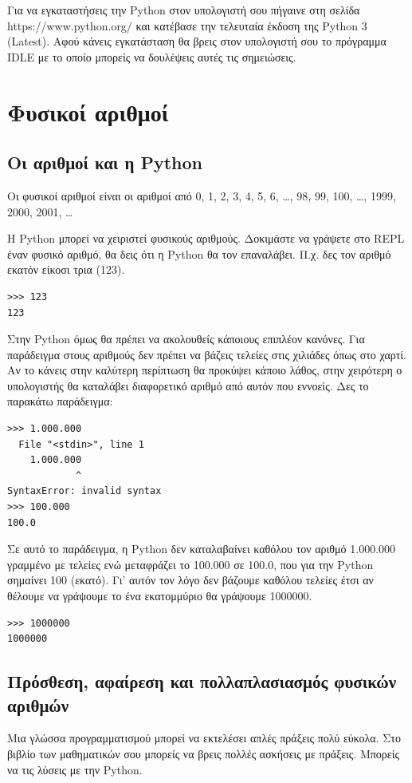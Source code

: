 \documentclass[b5paper,11pt,twoside,openleft]{memoir}
\begin{document}
Για να εγκαταστήσεις την Python στον υπολογιστή σου πήγαινε στη σελίδα https://www.python.org/ και κατέβασε την τελευταία έκδοση της Python 3 (Latest). Αφού κάνεις εγκατάσταση θα βρεις στον υπολογιστή σου το πρόγραμμα IDLE με το οποίο μπορείς να δουλέψεις αυτές τις σημειώσεις.

\chapter{Φυσικοί αριθμοί}

\section{Οι αριθμοί και η Python}

Οι φυσικοί αριθμοί είναι οι αριθμοί από 0, 1, 2, 3, 4, 5, 6, \ldots, 98, 99, 100, \ldots, 1999, 2000, 2001, \ldots

Η Python μπορεί να χειριστεί φυσικούς αριθμούς. Δοκιμάστε να γράψετε στο REPL έναν φυσικό αριθμό, θα δεις ότι η Python θα τον επαναλάβει. Π.χ. δες τον αριθμό εκατόν είκοσι τρια (123).
\begin{lstlisting}
>>> 123
123
\end{lstlisting}

Στην Python όμως θα πρέπει να ακολουθείς κάποιους επιπλέον κανόνες. Για παράδειγμα στους αριθμούς δεν πρέπει να βάζεις τελείες στις χιλιάδες όπως στο χαρτί. Αν το κάνεις στην καλύτερη περίπτωση θα προκύψει κάποιο λάθος, στην χειρότερη ο υπολογιστής θα καταλάβει διαφορετικό αριθμό από αυτόν που εννοείς.
Δες το παρακάτω παράδειγμα:
\begin{lstlisting}
>>> 1.000.000
  File "<stdin>", line 1
    1.000.000
            ^
SyntaxError: invalid syntax
>>> 100.000
100.0
\end{lstlisting}
Σε αυτό το παράδειγμα, η Python δεν καταλαβαίνει καθόλου τον αριθμό 1.000.000 γραμμένο με τελείες ενώ μεταφράζει το 100.000 σε 100.0, που για την Python σημαίνει 100 (εκατό). Γι' αυτόν τον λόγο δεν βάζουμε καθόλου τελείες έτσι αν θέλουμε να γράψουμε το ένα εκατομμύριο θα γράψουμε 1000000.
\begin{lstlisting}
>>> 1000000
1000000
\end{lstlisting}

\section{Πρόσθεση, αφαίρεση και πολλαπλασιασμός φυσικών αριθμών}
Μια γλώσσα προγραμματισμού μπορεί να εκτελέσει απλές πράξεις πολύ εύκολα. Στο βιβλίο των μαθηματικών  σου μπορείς να βρεις πολλές ασκήσεις με πράξεις. Μπορείς να τις λύσεις με την Python.
\end{document}
